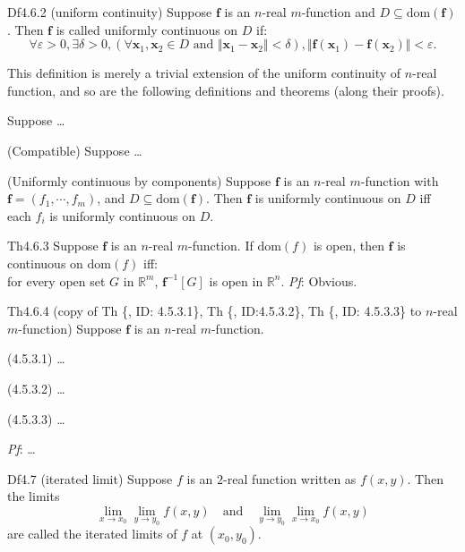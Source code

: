 \documentclass{article}
\begin{document}
\begin{Df}{Df4.6.2 (uniform continuity)}
    Suppose $\pmb{f}$ is an $n$-real $m$-function and $D\subseteq\text{dom}(\pmb{f})$. Then $\pmb{f}$ is called uniformly continuous on $D$ if:
    $$\forall\varepsilon>0, \exists\delta>0, \left(\forall \pmb{x}_1, \pmb{x}_2\in D\text{ and } \Vert\pmb{x}_1-\pmb{x}_2\Vert <\delta\right), \Vert\pmb{f}(\pmb{x}_1)-\pmb{f}(\pmb{x}_2)\Vert<\varepsilon.$$
\end{Df}

\begin{Rmk}{}
    This definition is merely a trivial extension of the uniform continuity of $n$-real function, and so are the following definitions and theorems (along their proofs).
    \begin{compactenum}
        \item \textcolor{Th}{Suppose \dots}
        \item \textcolor{Th}{(Compatible) Suppose \dots}
        \item \textcolor{Th}{(Uniformly continuous by components) Suppose $\pmb{f}$ is an $n$-real $m$-function with $\pmb{f} = (f_1, \cdots, f_m)$, and $D\subseteq\text{dom}(\pmb{f})$. Then $\pmb{f}$ is uniformly continuous on $D$ iff each $f_i$ is uniformly continuous on $D$.}
    \end{compactenum}
\end{Rmk}

\begin{Th}{Th4.6.3}
    Suppose $\pmb{f}$ is an $n$-real $m$-function. If $\text{dom}(f)$ is open, then $\pmb{f}$ is continuous on $\text{dom}(f)$ iff: \\
    for every open set $G$ in $\mathbb{R}^m$, $\pmb{f}^{-1}[G]$ is open in $\mathbb{R}^n$.
    \tcblower
    \textit{Pf}: Obvious.
\end{Th}

\begin{Th}{Th4.6.4 (copy of Th \{, ID: 4.5.3.1\}, Th \{, ID:4.5.3.2\}, Th \{, ID: 4.5.3.3\} to $n$-real $m$-function)}
    Suppose $\pmb{f}$ is an $n$-real $m$-function. 
    \begin{compactenum}
        \item (4.5.3.1) \dots
        \item (4.5.3.2) \dots
        \item (4.5.3.3) \dots
    \end{compactenum}
    \tcblower
    \textit{Pf}: \dots
\end{Th}

\begin{Df}{Df4.7 (iterated limit)}
    Suppose $f$ is an $2$-real function written as $f(x, y)$. Then the limits
    $$ \lim\limits_{x\to x_0} \lim\limits_{y\to y_0} f(x, y) \quad\text{and}\quad \lim\limits_{y\to y_0} \lim\limits_{x\to x_0} f(x, y) $$
    are called the iterated limits of $f$ at $(x_0, y_0)$.
\end{Df}
\end{document}
